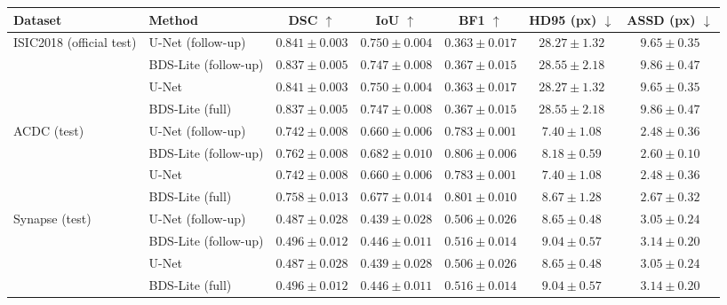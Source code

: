 \begin{tabular}{llccccc}
\toprule
Dataset & Method & DSC $\uparrow$ & IoU $\uparrow$ & BF1 $\uparrow$ & HD95 (px) $\downarrow$ & ASSD (px) $\downarrow$ \\
\midrule
ISIC2018 (official test) & U-Net (follow-up) & $0.841 \pm 0.003$ & $0.750 \pm 0.004$ & $0.363 \pm 0.017$ & $28.27 \pm 1.32$ & $9.65 \pm 0.35$ \\
 & BDS-Lite (follow-up) & $0.837 \pm 0.005$ & $0.747 \pm 0.008$ & $0.367 \pm 0.015$ & $28.55 \pm 2.18$ & $9.86 \pm 0.47$ \\
 & U-Net & $0.841 \pm 0.003$ & $0.750 \pm 0.004$ & $0.363 \pm 0.017$ & $28.27 \pm 1.32$ & $9.65 \pm 0.35$ \\
 & BDS-Lite (full) & $0.837 \pm 0.005$ & $0.747 \pm 0.008$ & $0.367 \pm 0.015$ & $28.55 \pm 2.18$ & $9.86 \pm 0.47$ \\
\midrule
ACDC (test) & U-Net (follow-up) & $0.742 \pm 0.008$ & $0.660 \pm 0.006$ & $0.783 \pm 0.001$ & $7.40 \pm 1.08$ & $2.48 \pm 0.36$ \\
 & BDS-Lite (follow-up) & $0.762 \pm 0.008$ & $0.682 \pm 0.010$ & $0.806 \pm 0.006$ & $8.18 \pm 0.59$ & $2.60 \pm 0.10$ \\
 & U-Net & $0.742 \pm 0.008$ & $0.660 \pm 0.006$ & $0.783 \pm 0.001$ & $7.40 \pm 1.08$ & $2.48 \pm 0.36$ \\
 & BDS-Lite (full) & $0.758 \pm 0.013$ & $0.677 \pm 0.014$ & $0.801 \pm 0.010$ & $8.67 \pm 1.28$ & $2.67 \pm 0.32$ \\
\midrule
Synapse (test) & U-Net (follow-up) & $0.487 \pm 0.028$ & $0.439 \pm 0.028$ & $0.506 \pm 0.026$ & $8.65 \pm 0.48$ & $3.05 \pm 0.24$ \\
 & BDS-Lite (follow-up) & $0.496 \pm 0.012$ & $0.446 \pm 0.011$ & $0.516 \pm 0.014$ & $9.04 \pm 0.57$ & $3.14 \pm 0.20$ \\
 & U-Net & $0.487 \pm 0.028$ & $0.439 \pm 0.028$ & $0.506 \pm 0.026$ & $8.65 \pm 0.48$ & $3.05 \pm 0.24$ \\
 & BDS-Lite (full) & $0.496 \pm 0.012$ & $0.446 \pm 0.011$ & $0.516 \pm 0.014$ & $9.04 \pm 0.57$ & $3.14 \pm 0.20$ \\
\bottomrule
\end{tabular}
